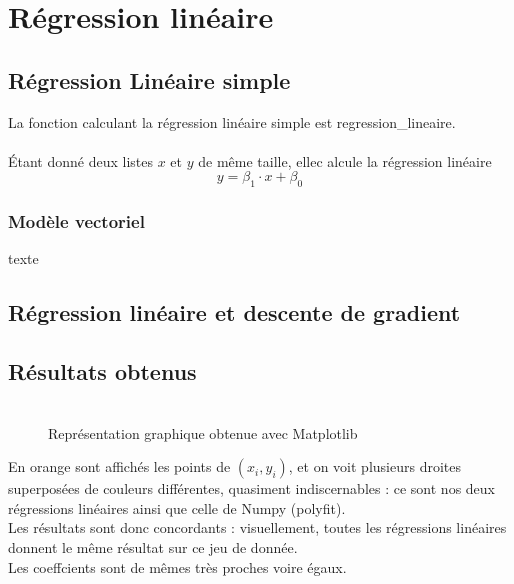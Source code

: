 \documentclass{article}      %
\begin{document}
\section{Régression linéaire}
\subsection{Régression Linéaire simple}
La fonction calculant la régression linéaire simple est regression\_lineaire.
\\%
\\Étant donné deux listes $x$ et $y$ de même taille, ellec alcule la régression linéaire $$y = \beta_1 \cdot x + \beta_0$$
%

\subsubsection{Modèle vectoriel}
texte

\subsection{Régression linéaire et descente de gradient}

\subsection{Résultats obtenus}
\begin{figure}[H]
    \centering
    \\Représentation graphique obtenue avec Matplotlib
\end{figure}
%
En orange sont affichés les points de $(x_i, y_i)$, et on voit plusieurs droites superposées de couleurs différentes, quasiment indiscernables : ce sont nos deux régressions linéaires ainsi que celle de Numpy (polyfit).
\\Les résultats sont donc concordants : visuellement, toutes les régressions linéaires donnent le même résultat sur ce jeu de donnée.
%
\\Les coeffcients sont de mêmes très proches voire égaux.
\end{document}
